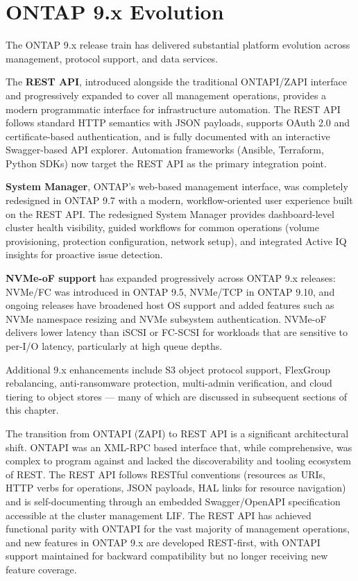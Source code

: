 \section{ONTAP 9.x Evolution}

The ONTAP 9.x release train has delivered substantial platform evolution across management, protocol support, and data services.

The \textbf{REST API}, introduced alongside the traditional ONTAPI/ZAPI interface and progressively expanded to cover all management operations, provides a modern programmatic interface for infrastructure automation. The REST API follows standard HTTP semantics with JSON payloads, supports OAuth 2.0 and certificate-based authentication, and is fully documented with an interactive Swagger-based API explorer. Automation frameworks (Ansible, Terraform, Python SDKs) now target the REST API as the primary integration point.

\textbf{System Manager}, ONTAP's web-based management interface, was completely redesigned in ONTAP 9.7 with a modern, workflow-oriented user experience built on the REST API. The redesigned System Manager provides dashboard-level cluster health visibility, guided workflows for common operations (volume provisioning, protection configuration, network setup), and integrated Active IQ insights for proactive issue detection.

\textbf{NVMe-oF support} has expanded progressively across ONTAP 9.x releases: NVMe/FC was introduced in ONTAP 9.5, NVMe/TCP in ONTAP 9.10, and ongoing releases have broadened host OS support and added features such as NVMe namespace resizing and NVMe subsystem authentication. NVMe-oF delivers lower latency than iSCSI or FC-SCSI for workloads that are sensitive to per-I/O latency, particularly at high queue depths.

Additional 9.x enhancements include S3 object protocol support, FlexGroup rebalancing, anti-ransomware protection, multi-admin verification, and cloud tiering to object stores --- many of which are discussed in subsequent sections of this chapter.

The transition from ONTAPI (ZAPI) to REST API is a significant architectural shift. ONTAPI was an XML-RPC based interface that, while comprehensive, was complex to program against and lacked the discoverability and tooling ecosystem of REST. The REST API follows RESTful conventions (resources as URIs, HTTP verbs for operations, JSON payloads, HAL links for resource navigation) and is self-documenting through an embedded Swagger/OpenAPI specification accessible at the cluster management LIF. The REST API has achieved functional parity with ONTAPI for the vast majority of management operations, and new features in ONTAP 9.x are developed REST-first, with ONTAPI support maintained for backward compatibility but no longer receiving new feature coverage.

